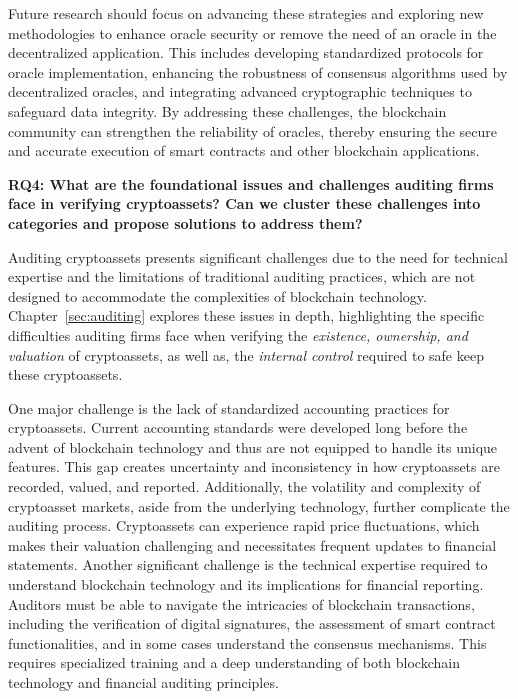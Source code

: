 Future research should focus on advancing these strategies and exploring new methodologies to enhance oracle security or remove the need of an oracle in the decentralized application. This includes developing standardized protocols for oracle implementation, enhancing the robustness of consensus algorithms used by decentralized oracles, and integrating advanced cryptographic techniques to safeguard data integrity. By addressing these challenges, the blockchain community can strengthen the reliability of oracles, thereby ensuring the secure and accurate execution of smart contracts and other blockchain applications.



\textbf{RQ4: What are the foundational issues and challenges auditing firms face in verifying cryptoassets? Can we cluster these challenges into categories and propose solutions to address them?}

Auditing cryptoassets presents significant challenges due to the need for technical expertise and the limitations of traditional auditing practices, which are not designed to accommodate the complexities of blockchain technology. Chapter~\ref{sec:auditing} explores these issues in depth, highlighting the specific difficulties auditing firms face when verifying the \textit{existence, ownership, and valuation} of cryptoassets, as well as, the \textit{internal control} required to safe keep these cryptoassets.

One major challenge is the lack of standardized accounting practices for cryptoassets. Current accounting standards were developed long before the advent of blockchain technology and thus are not equipped to handle its unique features. This gap creates uncertainty and inconsistency in how cryptoassets are recorded, valued, and reported. Additionally, the volatility and complexity of cryptoasset markets, aside from the underlying technology, further complicate the auditing process. Cryptoassets can experience rapid price fluctuations, which makes their valuation challenging and necessitates frequent updates to financial statements. Another significant challenge is the technical expertise required to understand blockchain technology and its implications for financial reporting. Auditors must be able to navigate the intricacies of blockchain transactions, including the verification of digital signatures, the assessment of smart contract functionalities, and in some cases understand the consensus mechanisms. This requires specialized training and a deep understanding of both blockchain technology and financial auditing principles.

